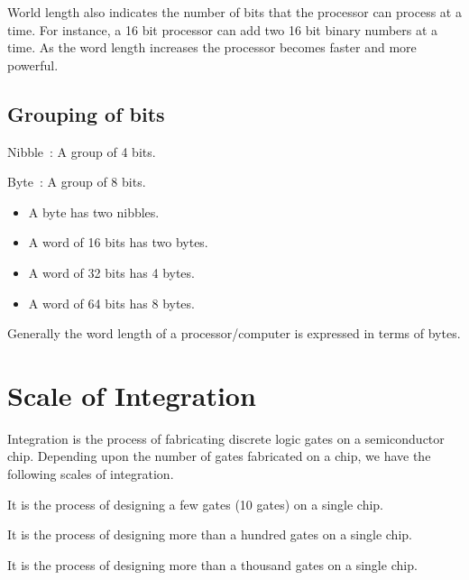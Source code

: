World length also indicates the number of bits that the processor can process at a time. For instance, a 16 bit processor can add two 16 bit binary numbers at a time. As the word length increases the processor becomes faster and more powerful.

\eject

\subsection{Grouping of bits}

Nibble~: A group of 4 bits.

Byte~: A group of 8 bits.
\begin{itemize}
\itemsep=0pt
\item A byte has two nibbles.

\item A word of 16 bits has two bytes.

\item A word of 32 bits has 4 bytes.

\item A word of 64 bits has 8 bytes.
\end{itemize}
Generally the word length of a processor/computer is expressed in terms of bytes.

\section{Scale of Integration}\label{sec7.2}

Integration is the process of fabricating discrete logic gates on a semiconductor chip. Depending upon the number of gates fabricated on a chip, we have the following scales of integration.

\medskip
{}

It is the process of designing a few gates (10 gates) on a single chip.

\medskip
{}

It is the process of designing more than a hundred gates on a single chip.

\medskip
{}

It is the process of designing more than a thousand gates on a single chip.

\medskip
{}

